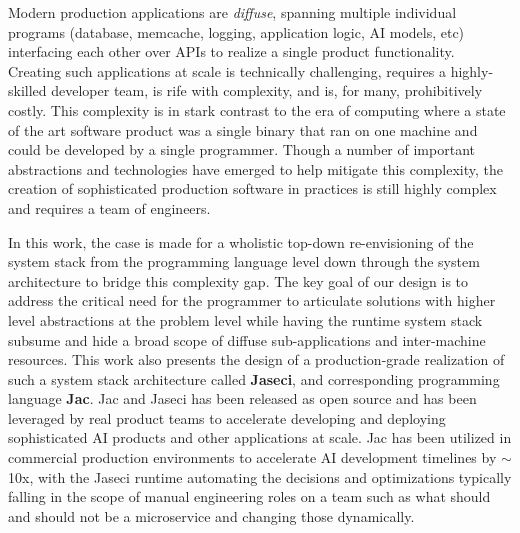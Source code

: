 Modern production applications are \emph{diffuse}, spanning multiple individual programs (database, memcache, logging, application logic, AI models, etc) interfacing each other over APIs to realize a single product functionality.
        Creating such applications at scale is technically challenging, requires a highly-skilled developer team, is rife with complexity, and is, for many, prohibitively costly.
        This complexity is in stark contrast to the era of computing where a state of the art software product was a single binary that ran on one machine and could be developed by a single programmer.
        Though a number of important abstractions and technologies have emerged to help mitigate this complexity, the creation of sophisticated production software in practices is still highly complex and requires a team of engineers.


        In this work, the case is made for a wholistic top-down re-envisioning of the system stack from the programming language level down through the system architecture to bridge this complexity gap.
        The key goal of our design is to address the critical need for the programmer to articulate solutions with higher level abstractions at the problem level while having the runtime system stack subsume and hide a broad scope of diffuse sub-applications and inter-machine resources.
        This work also presents the design of a production-grade realization of such a system stack architecture called \textbf{Jaseci}, and corresponding programming language \textbf{Jac}.
        Jac and Jaseci has been released as open source and has been leveraged by real product teams to accelerate developing and deploying sophisticated AI products and other applications at scale.
        Jac has been utilized in commercial production environments to accelerate AI development timelines by  $\sim$10x, with the Jaseci runtime automating the decisions and optimizations typically falling in the scope of manual engineering roles on a team such as what should and should not be a microservice and changing those dynamically.